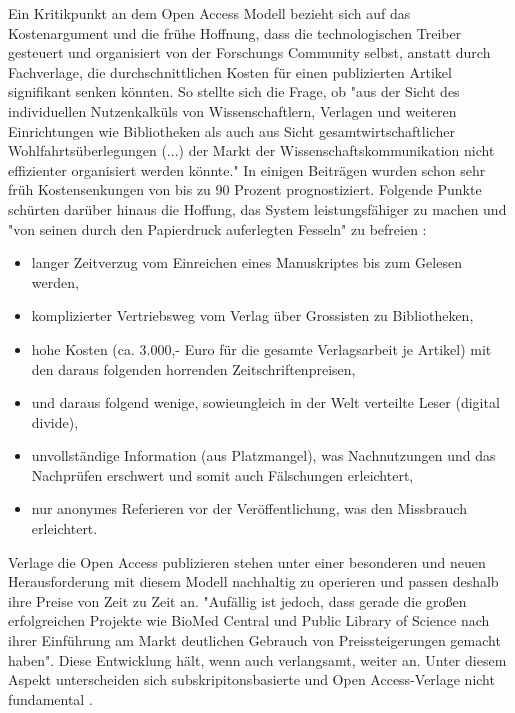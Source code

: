 Ein Kritikpunkt an dem Open Access Modell bezieht sich auf das Kostenargument und die frühe Hoffnung, dass die technologischen Treiber gesteuert und organisiert von der Forschungs Community selbst, anstatt durch Fachverlage, die durchschnittlichen Kosten für einen publizierten Artikel signifikant senken könnten. So stellte sich die Frage, ob
"aus der Sicht des individuellen Nutzenkalküls von Wissenschaftlern, Verlagen und weiteren Einrichtungen wie Bibliotheken als auch aus Sicht gesamtwirtschaftlicher Wohlfahrtsüberlegungen (...) der Markt der Wissenschaftskommunikation nicht effizienter organisiert werden könnte."\cite{Hess_2006} In einigen Beiträgen wurden schon sehr früh Kostensenkungen von bis zu 90 Prozent \cite{hilf_2004} \cite{suchen} prognostiziert. Folgende Punkte schürten darüber hinaus die Hoffung, das System leistungsfähiger zu machen und "von seinen durch den Papierdruck auferlegten Fesseln" zu befreien \cite{hilf_2004}:
\begin{itemize}
\item langer Zeitverzug vom Einreichen eines Manuskriptes bis zum Gelesen werden,
\item komplizierter Vertriebsweg vom Verlag über Grossisten zu Bibliotheken,
\item hohe Kosten (ca. 3.000,- Euro für die gesamte Verlagsarbeit je Artikel) mit den daraus folgenden horrenden Zeitschriftenpreisen,
\item und daraus folgend wenige, sowieungleich in der Welt verteilte Leser (digital divide),
\item unvollständige Information (aus Platzmangel), was Nachnutzungen und das Nachprüfen erschwert und somit auch Fälschungen erleichtert,
\item nur anonymes Referieren vor der Veröffentlichung, was den Missbrauch erleichtert. 
\end{itemize}

Verlage die Open Access publizieren stehen unter einer besonderen und neuen Herausforderung mit diesem Modell nachhaltig zu operieren und passen deshalb ihre Preise von Zeit zu Zeit an. "Aufällig ist jedoch, dass gerade die großen erfolgreichen Projekte wie BioMed Central und Public Library of Science nach ihrer Einführung am Markt deutlichen Gebrauch von Preissteigerungen gemacht haben"\cite{schmidt_2007_goldenen}. Diese Entwicklung hält, wenn auch verlangsamt, weiter an\cite{suchen}. Unter diesem Aspekt unterscheiden sich subskripitonsbasierte und Open Access-Verlage nicht fundamental \cite{schmidt_2007_goldenen}.

